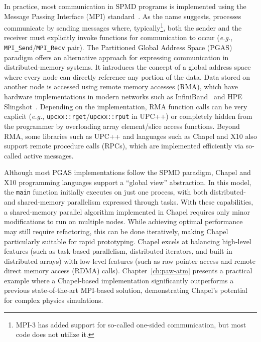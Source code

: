 In practice, most communication in SPMD programs is implemented using the Message Passing Interface (MPI) standard~\cite{mpi41}. As the name suggests, processes communicate by sending messages where, typically\footnote{MPI-3 has added support for so-called one-sided communication, but most code does not utilize it.}, both the sender and the receiver must explicitly invoke functions for communication to occur (\textit{e.g.}, \verb|MPI_Send|/\verb|MPI_Recv| pair). The Partitioned Global Address Space (PGAS) paradigm offers an alternative approach for expressing communication in distributed-memory systems. It introduces the concept of a global address space where every node can directly reference any portion of the data. Data stored on another node is accessed using remote memory accesses (RMA), which have hardware implementations in modern networks such as InfiniBand~ and HPE Slingshot~\cite{De_Sen_2020_An_In_Depth_Ana}. Depending on the implementation, RMA function calls can be very explicit (\textit{e.g.}, \verb|upcxx::rget|/\verb|upcxx::rput| in UPC++) or completely hidden from the programmer by overloading array element/slice access functions. Beyond RMA, some libraries such as UPC++ and languages such as Chapel and X10 also support remote procedure calls (RPCs), which are implemented efficiently via so-called active messages.

Although most PGAS implementations follow the SPMD paradigm, Chapel and X10 programming languages support a ``global view'' abstraction. In this model, the \verb|main| function initially executes on just one process, with both distributed- and shared-memory parallelism expressed through tasks. With these capabilities, a shared-memory parallel algorithm implemented in Chapel requires only minor modifications to run on multiple nodes. While achieving optimal performance may still require refactoring, this can be done iteratively, making Chapel particularly suitable for rapid prototyping. Chapel excels at balancing high-level features (such as task-based parallelism, distributed iterators, and built-in distributed arrays) with low-level features (such as raw pointer access and remote direct memory access (RDMA) calls). Chapter~\ref{ch:paw-atm} presents a practical example where a Chapel-based implementation significantly outperforms a previous state-of-the-art MPI-based solution, demonstrating Chapel's potential for complex physics simulations.

